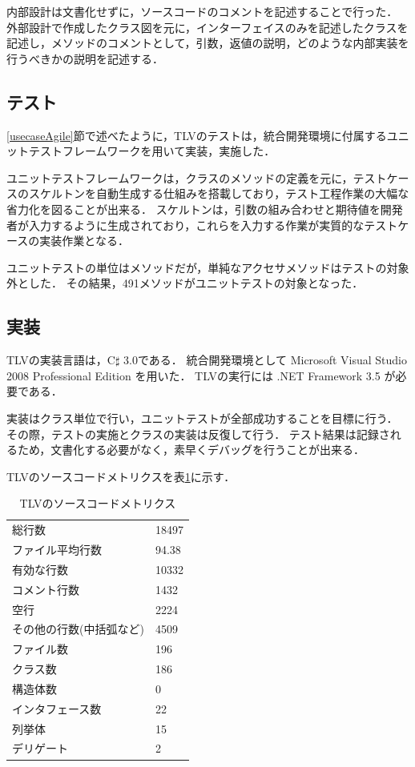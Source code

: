 内部設計は文書化せずに，ソースコードのコメントを記述することで行った．
外部設計で作成したクラス図を元に，インターフェイスのみを記述したクラスを記述し，メソッドのコメントとして，引数，返値の説明，どのような内部実装を行うべきかの説明を記述する．

\subsection{テスト}

\ref{usecaseAgile}節で述べたように，TLVのテストは，統合開発環境に付属するユニットテストフレームワークを用いて実装，実施した．

ユニットテストフレームワークは，クラスのメソッドの定義を元に，テストケースのスケルトンを自動生成する仕組みを搭載しており，テスト工程作業の大幅な省力化を図ることが出来る．
スケルトンは，引数の組み合わせと期待値を開発者が入力するように生成されており，これらを入力する作業が実質的なテストケースの実装作業となる．

ユニットテストの単位はメソッドだが，単純なアクセサメソッドはテストの対象外とした．
その結果，491メソッドがユニットテストの対象となった．

\subsection{実装}

TLVの実装言語は，C$\sharp$ 3.0である．
統合開発環境として Microsoft Visual Studio 2008 Professional Edition を用いた．
TLVの実行には .NET Framework 3.5 が必要である．

実装はクラス単位で行い，ユニットテストが全部成功することを目標に行う．
その際，テストの実施とクラスの実装は反復して行う．
テスト結果は記録されるため，文書化する必要がなく，素早くデバッグを行うことが出来る．

TLVのソースコードメトリクスを表\ref{sourceMetrics}に示す．

\begin{table}[htb]
\begin{center}
\begin{tabular}{l|l}
\hline
総行数              & 18497 \\
ファイル平均行数    & 94.38 \\
有効な行数          & 10332 \\
コメント行数        & 1432 \\
空行                & 2224 \\
その他の行数(中括弧など) & 4509 \\
ファイル数          & 196 \\
クラス数            & 186 \\
構造体数            & 0 \\
インタフェース数    & 22 \\
列挙体              & 15 \\
デリゲート          & 2 \\
\hline
\end{tabular}
\caption{TLVのソースコードメトリクス}
\label{sourceMetrics}
\end{center}
\end{table}

